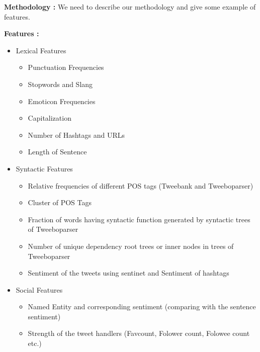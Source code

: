 \noindent \textbf{Methodology :}
We need to describe our methodology and give some example of features.


\noindent \textbf{Features :}
\begin{itemize}
 \item Lexical Features
 \begin{itemize}
  \item Punctuation Frequencies
  \item Stopwords and Slang
  \item Emoticon Frequencies
  \item Capitalization
  \item Number of Hashtags and URLs
  \item Length of Sentence
 \end{itemize}

 \item Syntactic Features
  \begin{itemize}
  \item Relative frequencies of different POS tags (Tweebank and Tweeboparser)
  \item Cluster of POS Tags
  \item Fraction of words having syntactic function generated by syntactic trees of Tweeboparser
  \item Number of unique dependency root trees or inner nodes in trees of Tweeboparser
  \item Sentiment of the tweets using sentinet and Sentiment of hashtags
 \end{itemize}
 \item Social Features
  \begin{itemize}
  \item Named Entity and corresponding sentiment (comparing with the sentence sentiment)
  \item Strength of the tweet handlers (Favcount, Folower count, Folowee count etc.)
 \end{itemize}
\end{itemize}



